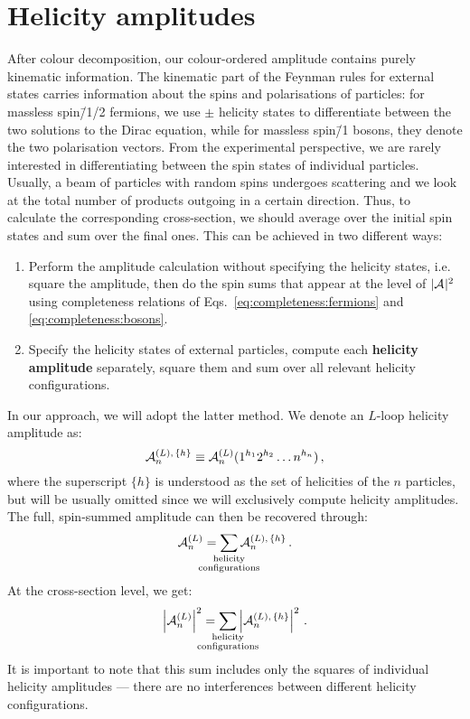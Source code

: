 \documentclass[main.tex]{subfiles}
\begin{document}
\section{Helicity amplitudes}
After colour decomposition, our colour-ordered amplitude contains purely kinematic information. The kinematic part of the Feynman rules for external states carries information about the spins and polarisations of particles: for massless spin\=/1/2 fermions, we use $\pm$ helicity states to differentiate between the two solutions to the Dirac equation, while for massless spin\=/1 bosons, they denote the two polarisation vectors. From the experimental perspective, we are rarely interested in differentiating between the spin states of individual particles. Usually, a beam of particles with random spins undergoes scattering and we look at the total number of products outgoing in a certain direction. Thus, to calculate the corresponding cross-section, we should average over the initial spin states and sum over the final ones. This can be achieved in two different ways: 
\begin{enumerate}
    \item Perform the amplitude calculation without specifying the helicity states, i.e. square the amplitude, then do the spin sums that appear at the level of $|\mathcal{A}_{}^{}|^2$ using completeness relations of Eqs.~\ref{eq:completeness:fermions} and \ref{eq:completeness:bosons}.
    \item Specify the helicity states of external particles, compute each \textbf{helicity amplitude} separately, square them and sum over all relevant helicity configurations.
\end{enumerate}
In our approach, we will adopt the latter method. We denote an $L$-loop helicity amplitude as:
\begin{equation} \label{eq:helampdef}
    \mathcal{A}_{n}^{(L),\,\{h\}} \equiv \mathcal{A}_{n}^{(L)}(1^{h_1}2^{h_2} \ldots n^{h_n})\,,
\end{equation}
where the superscript $\{h\}$ is understood as the set of helicities of the $n$ particles, but will be usually omitted since we will exclusively compute helicity amplitudes. The full, spin-summed amplitude can then be recovered through:
\begin{equation}
    \ampl{n}{(L)} = \sum_{\mathclap{\substack{\text{helicity} \\ \text{configurations}}}} \ampl{n}{(L),\,\{h\}} \,.
\end{equation}
At the cross-section level, we get:
\begin{equation}
    \left|\ampl{n}{(L)}\right|^2 = \sum_{\mathclap{\substack{\text{helicity} \\ \text{configurations}}}} \left|\ampl{n}{(L),\,\{h\}} \right|^2 \,.
\end{equation}
It is important to note that this sum includes only the squares of individual helicity amplitudes --- there are no interferences between different helicity configurations.
\end{document}
